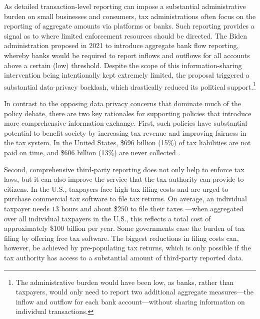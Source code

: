 \documentclass[12pt]{article}
\begin{document}
As detailed transaction-level reporting can impose a substantial administrative burden on small businesses and consumers, tax administrations often focus on the reporting of aggregate amounts via platforms or banks. Such reporting provides a signal as to where limited enforcement resources should be directed. The Biden administration proposed in 2021 to introduce aggregate bank flow reporting, whereby banks would be required to report inflows and outflows for all accounts above a certain (low) threshold. Despite the scope of this information-sharing intervention being intentionally kept extremely limited, the proposal triggered a substantial data-privacy backlash, which drastically reduced its political support.\footnote{The administrative burden would have been low, as banks, rather than taxpayers, would only need to report two additional aggregate measures—the inflow and outflow for each bank account—without sharing information on individual transactions.}

In contrast to the opposing data privacy concerns that dominate much of the policy debate, there are two key rationales for supporting policies that introduce more comprehensive information exchange. First, such policies have substantial potential to benefit society by increasing tax revenue and improving fairness in the tax system. In the United States, \$696 billion (15\%) of tax liabilities are not paid on time, and \$606 billion (13\%) are never collected \parencite{IRS_TaxGap_2022_Pub5869}.

Second, comprehensive third-party reporting does not only help to enforce tax laws, but it can also improve the service that the tax authority can provide to citizens. In the U.S., taxpayers face high tax filing costs and are urged to purchase commercial tax software to file tax returns. On average, an individual taxpayer needs $13$ hours and about \$$250$ to file their taxes \parencite[][]{IRS2022}—when aggregated over all individual taxpayers in the U.S., this reflects a total cost of approximately \$$100$ billion per year. %
Some governments ease the burden of tax filing by offering free tax software. The biggest reductions in filing costs can, however, be achieved by pre-populating tax returns, which is only possible if the tax authority has access to a substantial amount of third-party reported data.  
\end{document}
